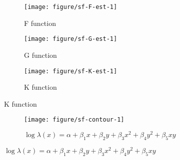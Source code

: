 \documentclass[10pt,fleqn]{article}\usepackage[]{graphicx}\usepackage[]{color}
\newenvironment{knitrout}{}{} %
\begin{document}
\begin{figure}[!ht]
\caption{Distance functions}

\centering
\begin{subfigure}[t]{0.32\textwidth}
\caption{F function}
\begin{knitrout}\footnotesize
{}\color{fgcolor}

{\centering \texttt{[image: figure/sf-F-est-1]} 

}



\end{knitrout}
\end{subfigure}
%
\begin{subfigure}[t]{0.32\textwidth}
\caption{G function}
\begin{knitrout}\footnotesize
{}\color{fgcolor}

{\centering \texttt{[image: figure/sf-G-est-1]} 

}



\end{knitrout}
\end{subfigure}
%
\begin{subfigure}[t]{0.32\textwidth}
\caption{K function}
\begin{knitrout}\footnotesize
{}\color{fgcolor}

{\centering \texttt{[image: figure/sf-K-est-1]} 

}



\end{knitrout}
\end{subfigure}
\end{figure}

\begin{figure}[!ht]
\caption{Inhomogeneous intensity models for defect roots}

\begin{subfigure}[t]{0.45\textwidth}
\caption{$\log \lambda(x) = \alpha + \beta_1x + \beta_2y + \beta_3x^2 + \beta_4y^2 + \beta_5xy$}
\begin{knitrout}\footnotesize
{}\color{fgcolor}

{\centering \texttt{[image: figure/sf-contour-1]} 

}



\end{knitrout}
\end{subfigure}



\end{figure}

\end{document}
